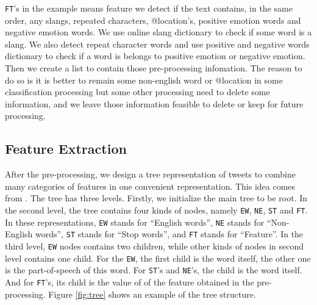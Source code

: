 \documentclass[english, table, latin9]{article}
\begin{document}
\par \texttt{FT}'s in the example means feature we detect if the text contains, in the same order, any slangs, repeated characters, @location's, positive emotion words and negative emotion words. We use online slang dictionary \cite{bib5} to check if some word is a slang. We also detect repeat character words and use positive and negative words dictionary to check if a word is belongs to positive emotion or negative emotion. Then we create a list to contain those pre-processing infomation. The reason to do so is it is better to remain some non-english word or @location in some classification processing but some other processing need to delete some information, and we leave those information feasible to delete or keep for future processing.

\subsection{Feature Extraction}
\label{sc33}
After the pre-processing, we design a tree representation of tweets to combine many categories of features in one convenient representation. This idea comes from \cite{bib1}. The tree has three levels. Firstly, we initialize the main tree to be root. In the second level, the tree contains four kinds of nodes, namely \texttt{EW}, \texttt{NE}, \texttt{ST} and \texttt{FT}. In these representations, \texttt{EW} stands for ``English words'', \texttt{NE} stands for ``Non-English words'', \texttt{ST} stands for ``Stop words'', and \texttt{FT} stands for ``Feature''. In the third level, \texttt{EW} nodes contains two children, while other kinds of nodes in second level contains one child. For the \texttt{EW}, the first child is the word itself, the other one is the part-of-speech of this word. For \texttt{ST}'s and \texttt{NE}'s, the child is the word itself. And for \texttt{FT}'s, its child is the value of of the feature obtained in the pre-processing. Figure \ref{fig:tree} shows an example of the tree structure.
\end{document}
